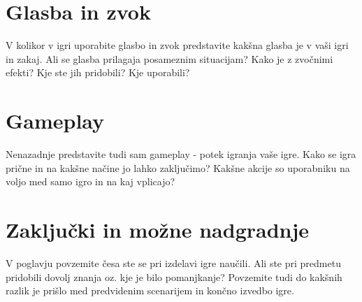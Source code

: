 \documentclass[a4paper]{article}
\begin{document}
\section{Glasba in zvok}
V kolikor v igri uporabite glasbo in zvok predstavite ka\-kšna glasba je v vaši igri in zakaj. Ali se glasba prilagaja posameznim situacijam? Kako je z zvočnimi efekti? Kje ste jih pridobili? Kje uporabili?

\section{Gameplay}
Nenazadnje predstavite tudi sam gameplay - potek igranja vaše igre. Kako se igra prične in na kakšne načine jo lahko zaključimo? Kakšne akcije so uporabniku na voljo med samo igro in na kaj vplicajo?


\section{Zaključki in možne nadgradnje}
V poglavju povzemite česa ste se pri izdelavi igre naučili. Ali ste pri predmetu pridobili dovolj znanja oz. kje je bilo pomanjkanje? Povzemite tudi do kakšnih razlik je prišlo med predvidenim scenarijem in končno izvedbo igre.


\small


\end{document}
